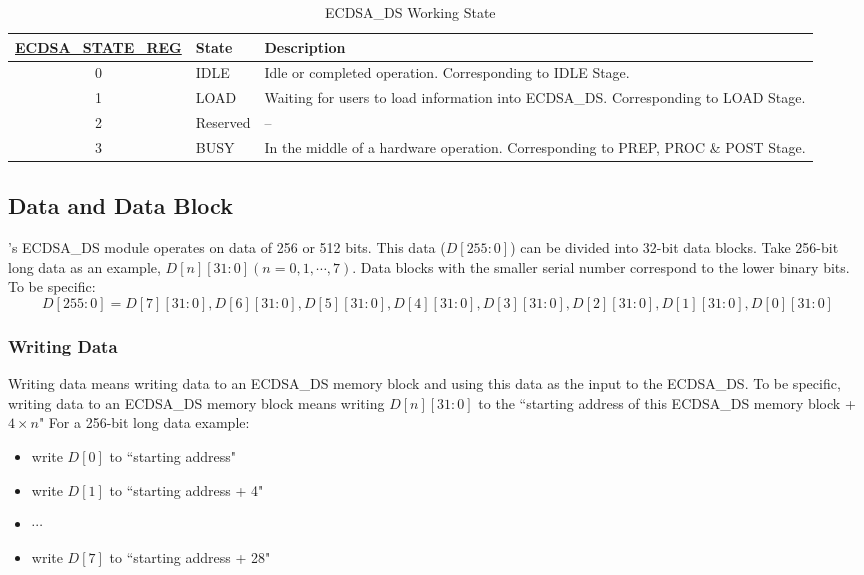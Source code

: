 \documentclass[main\_\_EN.tex]{subfiles}
\begin{document}
\begin{table}[H]
    \centering
    \caption{ECDSA\_DS Working State}
    \label{tab:ecdsa-working-state}
    \begin{tabular}{ | c | l | L{8cm} | }
    \hline
        \textbf{\hyperref[regdesc:ECDSASTATEREG]{ECDSA\_STATE\_REG}} & \textbf{State} &  \textbf{Description} \\     & IDLE      &   Idle or completed operation. Corresponding to IDLE Stage.\\     & LOAD      &   Waiting for users to load information into ECDSA\_DS. Corresponding to LOAD Stage.    \\     & Reserved      &  --    \\     & BUSY      &   In the middle of a hardware operation. Corresponding to PREP, PROC \& POST Stage.    \\ \hline
    \end{tabular}
\end{table}

\subsection{Data and Data Block}

\chipname{}'s ECDSA\_DS module operates on data of 256 or 512 bits. This data ($D[255:0]$) can be divided into 32-bit data blocks.\newline
Take 256-bit long data as an example, $D[n][31:0] (n=0, 1, \cdots, 7)$. Data blocks with the smaller serial number correspond to the lower binary bits. To be specific:
\[
D[255:0] = {D[7][31:0],D[6][31:0],D[5][31:0],
D[4][31:0],D[3][31:0],D[2][31:0],D[1][31:0],D[0][31:0]}
\]

\subsubsection{Writing Data}

Writing data means writing data to an ECDSA\_DS memory block and using this data as the input to the ECDSA\_DS. To be specific, writing data to an ECDSA\_DS memory block means writing $D[n][31:0]$ to the ``starting address of this ECDSA\_DS memory block + $4 \times n$"
For a 256-bit long data example:
\begin{itemize}
    \item write $D[0]$ to ``starting address"
    \item write $D[1]$ to ``starting address + 4"
    \item $\cdots$
    \item write $D[7]$ to ``starting address + 28"
\end{itemize}
\end{document}
